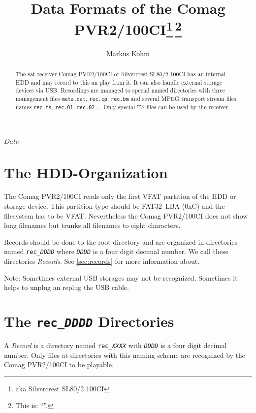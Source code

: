 \documentclass{scrartcl}
\newcommand*{\Comag}{Comag PVR2/100CI\xspace}
\newcommand*{\Silvercrest}{Silvercrest SL80/2 100CI\xspace}
\begin{document}
\pdfbookmark[1]{\Comag}{title}
\title{Data Formats of the \Comag\footnote{aka
    \Silvercrest}\,\footnote{This is: ``\SVNId''.}}
\author{Markus Kohm}
\SVNdate $Date$
\maketitle
\begin{abstract}
  The sat receiver \Comag or \Silvercrest has an internal HDD and may record
  to this an play from it. It can also handle external storage devices via
  USB. Recordings are managed to special named directories with three
  management files \texttt{meta.dat}, \texttt{rec.cp}, \texttt{rec.bm} and
  several MPEG transport stream files, names \texttt{rec.ts}, \texttt{rec.01},
  \texttt{rec.02} \dots\@\ Only special TS files can be used by the receiver.
\end{abstract}

\tableofcontents

\section{The HDD-Organization}
\label{sec:hdd-organization}

The \Comag reads only the first VFAT partition of the HDD or storage
device. This partition type should be FAT32~LBA (0xC) and the filesystem has
to be VFAT. Nevertheless the \Comag does not show long filenames but trunks
all filenames to eight characters.

Records should be done to the root directory and are organized in directories
named \texttt{rec\_\textit{DDDD}} where \texttt{\textit{DDDD}} is a four digit
decimal number. We call these directories \emph{Records}. See
\autoref{sec:records} for more information about.

Note: Sometimes external USB storages may not be recognized. Sometimes it
helps to unplug an replug the USB cable.

\section{The \texttt{rec\_\textit{DDDD}} Directories}
\label{sec:records}

A \emph{Record} is a directory named \texttt{rec\_\textit{XXXX}} with
\texttt{\textit{DDDD}} is a four digit decimal number. Only files at
directories with this naming scheme are recognized by the \Comag to be
playable.
\end{document}
